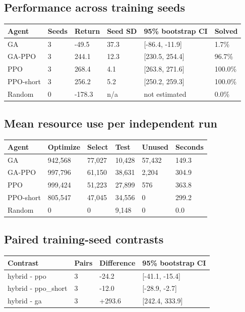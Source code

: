\documentclass[11pt,a4paper]{article}
\begin{document}
\subsection*{Performance across training seeds}
\begingroup\small
\begin{longtable}{p{}p{}p{}p{}p{}p{}}
\toprule
Agent & Seeds & Return & Seed SD & 95\% bootstrap CI & Solved \\
\midrule\endhead
GA & 3 & -49.5 & 37.3 & [-86.4, -11.9] & 1.7\% \\
GA-PPO & 3 & 244.1 & 12.3 & [230.5, 254.4] & 96.7\% \\
PPO & 3 & 268.4 & 4.1 & [263.8, 271.6] & 100.0\% \\
PPO-short & 3 & 256.2 & 5.2 & [250.2, 259.3] & 100.0\% \\
Random & 0 & -178.3 & n/a & not estimated & 0.0\% \\
\bottomrule\end{longtable}
\endgroup
\subsection*{Mean resource use per independent run}
\begingroup\small
\begin{longtable}{p{}p{}p{}p{}p{}p{}}
\toprule
Agent & Optimize & Select & Test & Unused & Seconds \\
\midrule\endhead
GA & 942,568 & 77,027 & 10,428 & 57,432 & 149.3 \\
GA-PPO & 997,796 & 61,150 & 38,631 & 2,204 & 304.9 \\
PPO & 999,424 & 51,223 & 27,899 & 576 & 363.8 \\
PPO-short & 805,547 & 47,045 & 34,556 & 0 & 299.2 \\
Random & 0 & 0 & 9,148 & 0 & 0.0 \\
\bottomrule\end{longtable}
\endgroup
\subsection*{Paired training-seed contrasts}
\begingroup\small
\begin{longtable}{p{}p{}p{}p{}}
\toprule
Contrast & Pairs & Difference & 95\% bootstrap CI \\
\midrule\endhead
hybrid - ppo & 3 & -24.2 & [-41.1, -15.4] \\
hybrid - ppo\_short & 3 & -12.0 & [-28.9, -2.7] \\
hybrid - ga & 3 & +293.6 & [242.4, 333.9] \\
\bottomrule\end{longtable}
\endgroup
\end{document}
